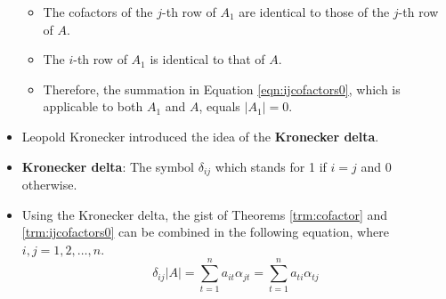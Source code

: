 \documentclass[titlepage]{article}
\numberwithin{figure}{section}
\numberwithin{equation}{section}
\numberwithin{theorem}{section}
\begin{document}
\begin{itemize}
\begin{itemize}
        \item The cofactors of the $j$-th row of $A_1$ are identical to those of the $j$-th row of $A$.
        \item The $i$-th row of $A_1$ is identical to that of $A$.
        \item Therefore, the summation in Equation \ref{eqn:ijcofactors0}, which is applicable to both $A_1$ and $A$, equals $|A_1|=0$.
    \end{itemize}
    \item Leopold Kronecker introduced the idea of the \textbf{Kronecker delta}.
    \item \textbf{Kronecker delta}: The symbol $\delta_{ij}$ which stands for 1 if $i=j$ and 0 otherwise.
    \item Using the Kronecker delta, the gist of Theorems \ref{trm:cofactor} and \ref{trm:ijcofactors0} can be combined in the following equation, where $i,j=1,2,\dots,n$.
    \begin{equation*}
        \delta_{ij}|A| = \sum_{t=1}^na_{it}\alpha_{jt} = \sum_{t=1}^na_{ti}\alpha_{tj}
    \end{equation*}
\end{itemize}
\end{document}
